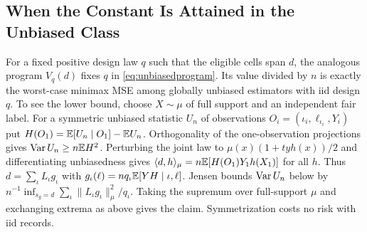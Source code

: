 \subsection{When the Constant Is Attained in the Unbiased Class}
For a fixed positive design law $q$ such that the eligible cells span $d$, the analogous program $V_q(d)$ fixes $q$ in \eqref{eq:unbiasedprogram}. Its value divided by $n$ is exactly the worst-case minimax MSE among globally unbiased estimators with iid design $q$. To see the lower bound, choose $X\sim\mu$ of full support and an independent fair label. For a symmetric unbiased statistic $U_n$ of observations $O_i=(\iota_i,\ell_{\iota_i},Y_i)$ put $H(O_1)=\mathbb{E}[U_n\mid O_1]-\mathbb{E} U_n$. Orthogonality of the one-observation projections gives $\operatorname{Var} U_n\ge n\mathbb{E} H^2$. Perturbing the joint law to $\mu(x)(1+t y h(x))/2$ and differentiating unbiasedness gives $\langle d,h\rangle_\mu=n\mathbb{E}[H(O_1)Y_1h(X_1)]$ for all $h$. Thus $d=\sum_\iota L_\iota g_\iota$ with $g_\iota(\ell)=nq_\iota\mathbb{E}[YH\mid \iota,\ell]$. Jensen bounds $\operatorname{Var} U_n$ below by $n^{-1}\inf_{s_g=d}\sum_\iota\|L_\iota g_\iota\|_\mu^2/q_\iota$. Taking the supremum over full-support $\mu$ and exchanging extrema as above gives the claim. Symmetrization costs no risk with iid records.

